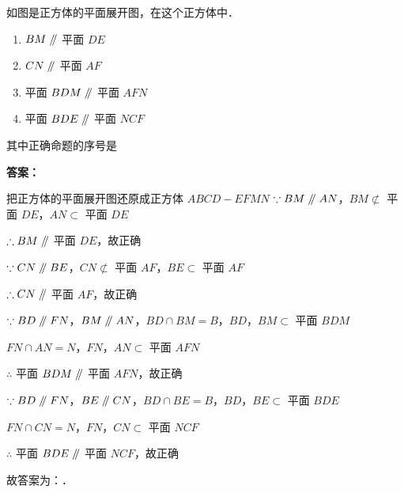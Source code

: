 \vspace{2em}


\begin{example}[\bkstar{3}{5}]
如图是正方体的平面展开图，在这个正方体中．
\begin{enumerate}
    \item[\ding{172}] $BM\mathrel{/\mkern-5mu/}$ 平面 $DE$
    \item[\ding{173}] $CN\mathrel{/\mkern-5mu/}$ 平面 $AF$
    \item[\ding{174}] 平面 $BDM\mathrel{/\mkern-5mu/}$ 平面 $AFN$
    \item[\ding{175}] 平面 $BDE\mathrel{/\mkern-5mu/}$ 平面 $NCF$
\end{enumerate}
其中正确命题的序号是
\end{example}
\begin{solution}
\textbf{答案：}

把正方体的平面展开图还原成正方体 $ABCD-EFMN$
$\because BM\mathrel{/\mkern-5mu/} AN$，$BM\not\subset$ 平面 $DE$，$AN\subset$ 平面 $DE$

$\therefore BM\mathrel{/\mkern-5mu/}$ 平面 $DE$，故正确

$\because CN\mathrel{/\mkern-5mu/} BE$，$CN\not\subset$ 平面 $AF$，$BE\subset$ 平面 $AF$

$\therefore CN\mathrel{/\mkern-5mu/}$ 平面 $AF$，故正确

$\because BD\mathrel{/\mkern-5mu/} FN$，$BM\mathrel{/\mkern-5mu/} AN$，$BD\cap BM=B$，$BD$，$BM\subset$ 平面 $BDM$

$FN\cap AN=N$，$FN$，$AN\subset$ 平面 $AFN$

$\therefore$ 平面 $BDM\mathrel{/\mkern-5mu/}$ 平面 $AFN$，故正确

$\because BD\mathrel{/\mkern-5mu/} FN$，$BE\mathrel{/\mkern-5mu/} CN$，$BD\cap BE=B$，$BD$，$BE\subset$ 平面 $BDE$

$FN\cap CN=N$，$FN$，$CN\subset$ 平面 $NCF$

$\therefore$ 平面 $BDE\mathrel{/\mkern-5mu/}$ 平面 $NCF$，故正确

故答案为：．
\end{solution}

\vspace{2em}

